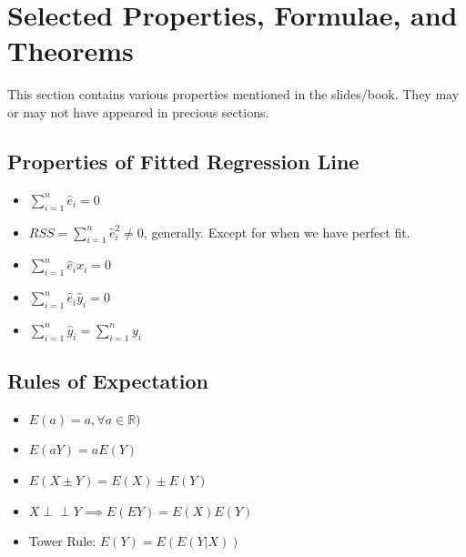 \documentclass[10pt]{article}
\newcommand{\real}{\mathbb{R}}
\newcommand{\independent}{\perp \!\!\! \perp}
\begin{document}
\newpage
\section{Selected Properties, Formulae, and Theorems}
This section contains various properties mentioned in the slides/book. They may or may not have appeared in precious sections. 
\subsection{Properties of Fitted Regression Line}
\begin{itemize}
    \item $\sum_{i = 1}^n \hat{e}_i = 0$
    \item $RSS = \sum_{i = 1}^n \hat{e}_i^2 \neq 0$, generally. Except for when we have perfect fit.
    \item $\sum_{i= 1}^n \hat{e}_i x_i = 0$
    \item $\sum_{i= 1}^n \hat{e}_i \hat{y}_i = 0$
    \item $\sum_{i = 1}^n \hat{y}_i = \sum_{i= 1}^n y_i$
\end{itemize}

\subsection{Rules of Expectation}
\begin{itemize}
    \item $E(a) = a, \forall a \in \real)$
    \item $E(aY) = aE(Y)$
    \item $E(X \pm Y) = E(X) \pm E(Y)$
    \item $X\independent Y \implies E(EY) = E(X) E(Y)$
    \item Tower Rule: $E(Y) = E(E(Y|X))$
\end{itemize}
\end{document}
